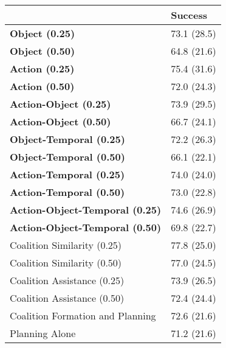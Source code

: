 \begin{tabular}{ll}
\hline
                                        & Success     \\
\hline
 \textbf{Object (0.25)}                 & 73.1 (28.5) \\
 \textbf{Object (0.50)}                 & 64.8 (21.6) \\
 \textbf{Action (0.25)}                 & 75.4 (31.6) \\
 \textbf{Action (0.50)}                 & 72.0 (24.3) \\
 \textbf{Action-Object (0.25)}          & 73.9 (29.5) \\
 \textbf{Action-Object (0.50)}          & 66.7 (24.1) \\
 \textbf{Object-Temporal (0.25)}        & 72.2 (26.3) \\
 \textbf{Object-Temporal (0.50)}        & 66.1 (22.1) \\
 \textbf{Action-Temporal (0.25)}        & 74.0 (24.0) \\
 \textbf{Action-Temporal (0.50)}        & 73.0 (22.8) \\
 \textbf{Action-Object-Temporal (0.25)} & 74.6 (26.9) \\
 \textbf{Action-Object-Temporal (0.50)} & 69.8 (22.7) \\
 Coalition Similarity (0.25)            & 77.8 (25.0) \\
 Coalition Similarity (0.50)            & 77.0 (24.5) \\
 Coalition Assistance (0.25)            & 73.9 (26.5) \\
 Coalition Assistance (0.50)            & 72.4 (24.4) \\
 Coalition Formation and Planning       & 72.6 (21.6) \\
 Planning Alone                         & 71.2 (21.6) \\
\hline
\end{tabular}
